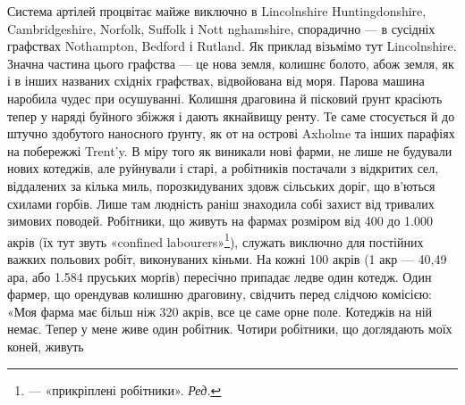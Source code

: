 Система артілей процвітає майже виключно в Lincolnshire
Huntingdonshire, Cambridgeshire, Norfolk, Suffolk і Nott nghamshire,
спорадично — в сусідніх графствах Nothampton, Bedford
і Rutland. Як приклад візьмімо тут Lincolnshire. Значна
частина цього графства — це нова земля, колишнє болото, абож
земля, як і в інших названих східніх графствах, відвойована від
моря. Парова машина наробила чудес при осушуванні. Колишня
драговина й пісковий ґрунт красіють тепер у наряді буйного
збіжжя і дають якнайвищу ренту. Те саме стосується й до штучно
здобутого наносного ґрунту, як от на острові Axholme та інших
парафіях на побережжі Trent’y. В міру того як виникали нові
фарми, не лише не будували нових котеджів, але руйнували і
старі, а робітників постачали з відкритих сел, віддалених за
кілька миль, порозкидуваних здовж сільських доріг, що в’ються
схилами горбів. Лише там людність раніш знаходила собі захист
від тривалих зимових поводей. Робітники, що живуть на фармах
розміром від 400 до 1.000 акрів (їх тут звуть «confined labourers»\footnote*{
— «прикріплені робітники». \emph{Ред.}
}),
служать виключно для постійних важких польових робіт, виконуваних
кіньми. На кожні 100 акрів (1 акр — 40,49 ара, або
1.584 пруських морґів) пересічно припадає ледве один котедж.
Один фармер, що орендував колишню драговину, свідчить перед
слідчою комісією: «Моя фарма має більш ніж 320 акрів, все це
саме орне поле. Котеджів на ній немає. Тепер у мене живе один
робітник. Чотири робітники, що доглядають моїх коней, живуть
\parbreak{}  %
